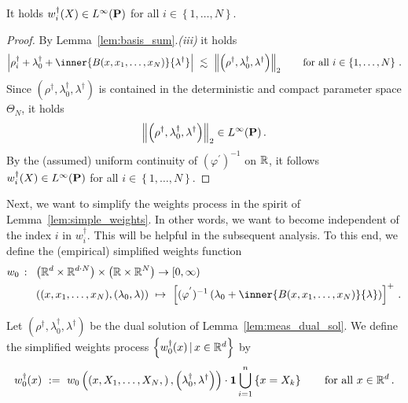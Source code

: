 \begin{lemma}
  \label{weights_l_inf}
  It holds
  $w_i^\dagger(X)\in L^\infty(\P)$
  for all $i\in \left\{ 1,\ldots,N \right\}$.
\end{lemma}
\begin{proof}
  By Lemma~\ref{lem:basis_sum}.\textit{(iii)} it holds
  \begin{align*}
  \left| 
    \rho_i^\dagger
    +
    \lambda_0^\dagger
    +
    \inner
    {B(x,x_1,\ldots,x_N)}
    {\lambda^\dagger}
  \right|
  \ 
  \lesssim
  \ 
  \norm{
\left( \rho^\dagger,\lambda_0^\dagger,\lambda^\dagger \right)
  }_2
  \qquad
  \text{for all}\ 
  i \in \left\{ 1,\ldots,N \right\}
  \,.
  \end{align*}
  Since
  $
\left( \rho^\dagger,\lambda_0^\dagger,\lambda^\dagger \right)
  $ is contained in the deterministic and compact parameter space $\Theta_N$,
  it holds
  \begin{align*}
  \norm{
\left( \rho^\dagger,\lambda_0^\dagger,\lambda^\dagger \right)
  }_2
  \in 
  L^{\infty}(\P)
  \,.
  \end{align*}
  By the (assumed) uniform continuity of 
  $
  (\varphi^{'})^{-1}
  $
  on $\R$, it follows 
  $w_i^\dagger(X)\in L^\infty(\P)$
  for all $i\in \left\{ 1,\ldots,N \right\}$.
\end{proof}
Next, we want to simplify the weights process in the spirit of Lemma~\ref{lem:simple_weights}.
In other words, we want to become independent of the index $i$ in $w_i^\dagger$. This will be helpful in the subsequent analysis.
To this end, we define the (empirical) simplified weights function
\begin{align*}
 w_0\ \colon\
 &
 \left( 
  \R^d\times \R^{d\cdot N}
 \right)
  \times
  \left( 
    \R\times \R^N
  \right)
  \to
  [0,\infty)
  \\
 &
  \left( 
  (x,x_1,\ldots,x_N),(\lambda_0,\lambda)
  \right)
  \ 
  \mapsto
  \ 
  \left[ 
  (\varphi^{'})^{-1}
  \left( 
    \lambda_0
    +
    \inner
    {B(x,x_1,\ldots,x_N)}
    {\lambda}
  \right)
\right]^+
\,.
\end{align*}
\begin{definition}
  Let 
  $
\left( \rho^\dagger,\lambda_0^\dagger,\lambda^\dagger \right)
  $
  be the dual solution of Lemma~\ref{lem:meas_dual_sol}.
  We define the simplified weights process 
  $\left\{ w_0^\dagger(x) \,|\, x\in\R^d\right\}$
  by
  \begin{align*}
    w_0^\dagger(x) 
    \ 
    :=
    \ 
    w_0
    \left( 
    \left( 
    x,X_1,\ldots,X_N,
    \right)
    ,
\left( \lambda_0^\dagger,\lambda^\dagger \right)
    \right)
    \cdot
    \mathbf{1}
    \bigcup_{i=1}^n
    \left\{ 
      x=X_k
    \right\}
    \qquad
    \text{for all}\ 
    x\in\R^d
    \,.
  \end{align*}
\end{definition}
